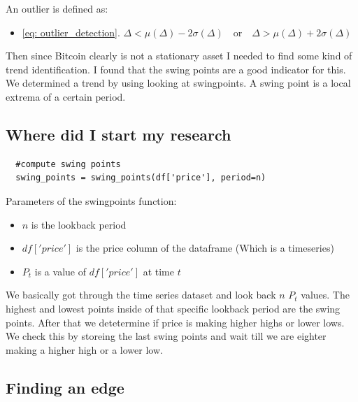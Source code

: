 \documentclass[12pt]{article}
\begin{document}
An outlier is defined as:

\begin{itemize}
  \item \eqref{eq: outlier_detection}.
  $\Delta < \mu(\Delta) - 2\sigma(\Delta) \quad \text{or} \quad \Delta > \mu(\Delta) + 2\sigma(\Delta)    $
\end{itemize}


Then since Bitcoin clearly is not a stationary asset I needed to find some kind of trend identification. I found that the swing points are a good indicator for this.
We determined a trend by using looking at swingpoints. A swing point is a local extrema of a certain period.

\subsection{Where did I start my research}
\begin{verbatim}
  #compute swing points
  swing_points = swing_points(df['price'], period=n)

\end{verbatim}

Parameters of the swing\textunderscore points function:
\begin{itemize}
  \item $n$ is the lookback period
  \item $df['price']$ is the price column of the dataframe (Which is a timeseries)
  \item $P_t$ is a value of $df['price']$ at time $t$
\end{itemize}


We basically got through the time series dataset and look back $n$ $P_t$ values. The highest and lowest points inside of that specific lookback period are the swing points. After that we detetermine if price is making higher highs or lower lows. We check this by storeing the last swing points and wait till we are eighter making a higher high or a lower low.



\subsection{Finding an edge}
\end{document}
